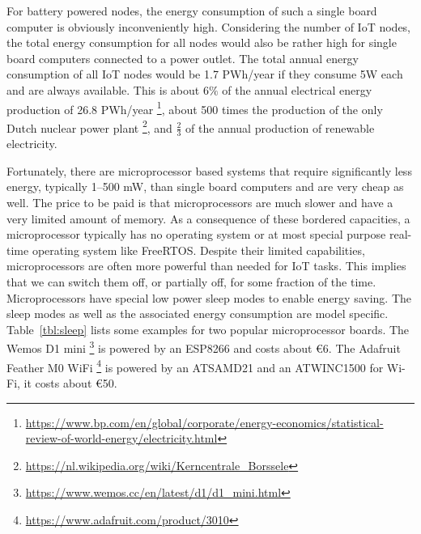 \documentclass[runningheads]{llncs}
\begin{document}
For battery powered nodes, the energy consumption of such a single board computer is obviously inconveniently high.
Considering the number of IoT nodes, the total energy consumption for all nodes would also be rather high for single board computers connected to a power outlet.
The total annual energy consumption of all IoT nodes would be 1.7 PWh/year if they consume 5W each and are always available.
This is about $6\%$ of the annual electrical energy production of 26.8 PWh/year%
\footnote{\url{https://www.bp.com/en/global/corporate/energy-economics/statistical-review-of-world-energy/electricity.html}}, about 500 times the production of the only Dutch nuclear power plant%
\footnote{\url{https://nl.wikipedia.org/wiki/Kerncentrale_Borssele}},
and $\frac{2}{3}$ of the annual production of renewable electricity\footnotemark{}.

Fortunately, there are microprocessor based systems that require significantly less energy, typically 1--500 mW, than single board computers and are very cheap as well.
The price to be paid is that microprocessors are much slower and have a very limited amount of memory.
As a consequence of these bordered capacities, a microprocessor typically has no operating system or at most special purpose real-time operating system like {FreeRTOS}.
Despite their limited capabilities, microprocessors are often more powerful than needed for IoT tasks.
This implies that we can switch them off, or partially off, for some fraction of the time.
Microprocessors have special low power sleep modes to enable energy saving.
The sleep modes as well as the associated energy consumption are model specific.
Table~\ref{tbl:sleep} lists some examples for two popular microprocessor boards.
The Wemos D1 mini%
\footnote{\url{https://www.wemos.cc/en/latest/d1/d1_mini.html}}
is powered by an ESP8266 and costs about \euro{6}.
The Adafruit Feather M0 WiFi%
\footnote{\url{https://www.adafruit.com/product/3010}}
is powered by an ATSAMD21 and an ATWINC1500 for Wi-Fi, it costs about \euro{50}.
\end{document}
